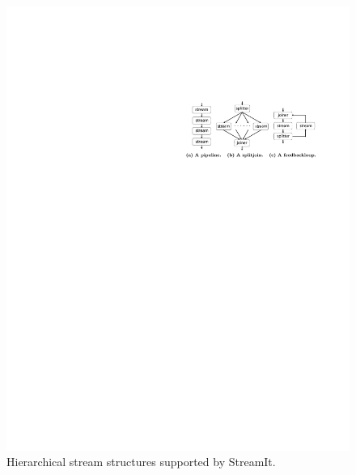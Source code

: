 \begin{figure}[t!]
\includegraphics[type=eps,ext=.eps,read=.eps]{stream-structures}
\caption{Hierarchical stream structures supported by StreamIt.\protect\label{fig:structures}}
\end{figure}

